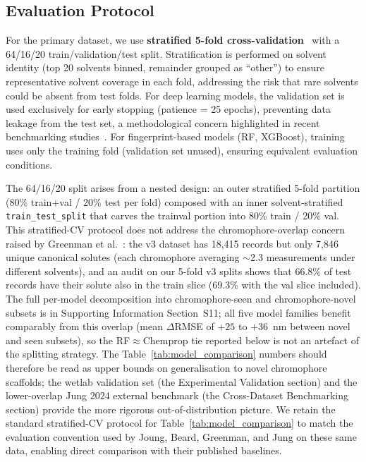 \documentclass[journal=jcisd8,manuscript=article]{achemso}
\begin{document}
\subsection{Evaluation Protocol}
\label{sec:evaluation}

For the primary dataset, we use \textbf{stratified 5-fold cross-validation}~\cite{kohavi1995study} with a 64/16/20 train/validation/test split.
Stratification is performed on solvent identity (top 20 solvents binned, remainder grouped as ``other'') to ensure representative solvent coverage in each fold, addressing the risk that rare solvents could be absent from test folds.
For deep learning models, the validation set is used exclusively for early stopping (patience = 25 epochs), preventing data leakage from the test set, a methodological concern highlighted in recent benchmarking studies~\cite{panapitiya2022evaluation}.
For fingerprint-based models (RF, XGBoost), training uses only the training fold (validation set unused), ensuring equivalent evaluation conditions.

The 64/16/20 split arises from a nested design: an outer stratified 5-fold partition (80\% train+val / 20\% test per fold) composed with an inner solvent-stratified \texttt{train\_test\_split} that carves the trainval portion into 80\% train / 20\% val. This stratified-CV protocol does not address the chromophore-overlap concern raised by Greenman et al.~\cite{greenman2022multifidelity}: the v3 dataset has 18{,}415 records but only 7{,}846 unique canonical solutes (each chromophore averaging $\sim$2.3 measurements under different solvents), and an audit on our 5-fold v3 splits shows that 66.8\% of test records have their solute also in the train slice (69.3\% with the val slice included). The full per-model decomposition into chromophore-seen and chromophore-novel subsets is in Supporting Information Section~S11; all five model families benefit comparably from this overlap (mean $\Delta$RMSE of $+25$ to $+36$~nm between novel and seen subsets), so the RF$\approx$Chemprop tie reported below is not an artefact of the splitting strategy. The Table~\ref{tab:model_comparison} numbers should therefore be read as upper bounds on generalisation to novel chromophore scaffolds; the wetlab validation set (the Experimental Validation section) and the lower-overlap Jung 2024 external benchmark (the Cross-Dataset Benchmarking section) provide the more rigorous out-of-distribution picture. We retain the standard stratified-CV protocol for Table~\ref{tab:model_comparison} to match the evaluation convention used by Joung, Beard, Greenman, and Jung on these same data, enabling direct comparison with their published baselines.
\end{document}
